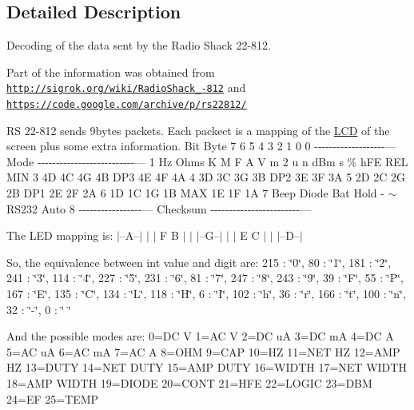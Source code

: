 \subsection{Detailed Description}
Decoding of the data sent by the Radio Shack 22-\/812. 

Part of the information was obtained from \href{http://sigrok.org/wiki/RadioShack_22-812}{\tt http\-://sigrok.\-org/wiki/\-Radio\-Shack\-\_-\/812} and \href{https://code.google.com/archive/p/rs22812/}{\tt https\-://code.\-google.\-com/archive/p/rs22812/}

R\-S 22-\/812 sends 9bytes packets. Each packect is a mapping of the \hyperlink{class_l_c_d}{L\-C\-D} of the screen plus some extra information. Bit Byte 7 6 5 4 3 2 1 0 0 -\/-\/-\/-\/-\/-\/-\/-\/-\/-\/-\/-\/-\/-\/-\/-\/-\/-\/-\/--- Mode -\/-\/-\/-\/-\/-\/-\/-\/-\/-\/-\/-\/-\/-\/-\/-\/-\/-\/-\/-\/-\/-\/-\/-\/-\/-\/--- 1 Hz Ohms K M F A V m 2 u n d\-Bm s \% h\-F\-E R\-E\-L M\-I\-N 3 4\-D 4\-C 4\-G 4\-B D\-P3 4\-E 4\-F 4\-A 4 3\-D 3\-C 3\-G 3\-B D\-P2 3\-E 3\-F 3\-A 5 2\-D 2\-C 2\-G 2\-B D\-P1 2\-E 2\-F 2\-A 6 1\-D 1\-C 1\-G 1\-B M\-A\-X 1\-E 1\-F 1\-A 7 Beep Diode Bat Hold -\/ $\sim$ R\-S232 Auto 8 -\/-\/-\/-\/-\/-\/-\/-\/-\/-\/-\/-\/-\/-\/-\/-\/-\/--- Checksum -\/-\/-\/-\/-\/-\/-\/-\/-\/-\/-\/-\/-\/-\/-\/-\/-\/-\/-\/-\/-\/-\/-\/-\/---

The L\-E\-D mapping is\-: $\vert$--A--$\vert$ $\vert$ $\vert$ F B $\vert$ $\vert$ $\vert$--G--$\vert$ $\vert$ $\vert$ E C $\vert$ $\vert$ $\vert$--D--$\vert$

So, the equivalence between int value and digit are\-: 215 \-: \char`\"{}0\char`\"{}, 80 \-: \char`\"{}1\char`\"{}, 181 \-: \char`\"{}2\char`\"{}, 241 \-: \char`\"{}3\char`\"{}, 114 \-: \char`\"{}4\char`\"{}, 227 \-: \char`\"{}5\char`\"{}, 231 \-: \char`\"{}6\char`\"{}, 81 \-: \char`\"{}7\char`\"{}, 247 \-: \char`\"{}8\char`\"{}, 243 \-: \char`\"{}9\char`\"{}, 39 \-: \char`\"{}\-F\char`\"{}, 55 \-: \char`\"{}\-P\char`\"{}, 167 \-: \char`\"{}\-E\char`\"{}, 135 \-: \char`\"{}\-C\char`\"{}, 134 \-: \char`\"{}\-L\char`\"{}, 118 \-: \char`\"{}\-H\char`\"{}, 6 \-: \char`\"{}\-I\char`\"{}, 102 \-: \char`\"{}h\char`\"{}, 36 \-: \char`\"{}r\char`\"{}, 166 \-: \char`\"{}t\char`\"{}, 100 \-: \char`\"{}n\char`\"{}, 32 \-: \char`\"{}-\/\char`\"{}, 0 \-: \char`\"{} \char`\"{}

And the possible modes are\-: 0=D\-C V 1=A\-C V 2=D\-C u\-A 3=D\-C m\-A 4=D\-C A 5=A\-C u\-A 6=A\-C m\-A 7=A\-C A 8=O\-H\-M 9=C\-A\-P 10=H\-Z 11=N\-E\-T H\-Z 12=A\-M\-P H\-Z 13=D\-U\-T\-Y 14=N\-E\-T D\-U\-T\-Y 15=A\-M\-P D\-U\-T\-Y 16=W\-I\-D\-T\-H 17=N\-E\-T W\-I\-D\-T\-H 18=A\-M\-P W\-I\-D\-T\-H 19=D\-I\-O\-D\-E 20=C\-O\-N\-T 21=H\-F\-E 22=L\-O\-G\-I\-C 23=D\-B\-M 24=E\-F 25=T\-E\-M\-P 

